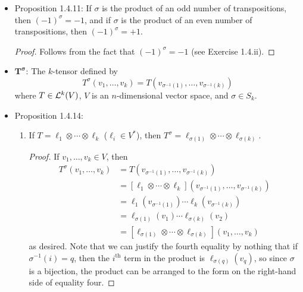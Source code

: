\documentclass[../notes.tex]{subfiles}
\begin{document}
\begin{itemize}
\begin{proof}
\begin{align*}
            &= \prod_{i<j}\frac{x_{\sigma_1\sigma_2(i)}-x_{\sigma_1\sigma_2(j)}}{x_{\sigma_2(i)}-x_{\sigma_2(j)}}\cdot\frac{x_{\sigma_2(i)}-x_{\sigma_2(j)}}{x_i-x_j}\\
            &= \prod_{i<j}\frac{x_{\sigma_1(p)}-x_{\sigma_1(q)}}{x_p-x_q}\cdot\prod_{i<j}\frac{x_{\sigma_2(i)}-x_{\sigma_2(j)}}{x_i-x_j}\\
            &= (-1)^{\sigma_1}(-1)^{\sigma_2}
        \end{align*}
        as desired.
    \end{proof}
    \item Proposition 1.4.11: If $\sigma$ is the product of an odd number of transpositions, then $(-1)^\sigma=-1$, and if $\sigma$ is the product of an even number of transpositions, then $(-1)^\sigma=+1$.
    \begin{proof}
        Follows from the fact that $(-1)^\sigma=-1$ (see Exercise 1.4.ii).
    \end{proof}
    \item $\bm{T^\sigma}$: The $k$-tensor defined by
    \begin{equation*}
        T^\sigma(v_1,\dots,v_k) = T(v_{\sigma^{-1}(1)},\dots,v_{\sigma^{-1}(k)})
    \end{equation*}
    where $T\in\lin[k]{V}$, $V$ is an $n$-dimensional vector space, and $\sigma\in S_k$.
    \item Proposition 1.4.14:
    \begin{enumerate}
        \item If $T=\ell_1\otimes\cdots\otimes\ell_k$ ($\ell_i\in V^*$), then $T^\sigma=\ell_{\sigma(1)}\otimes\cdots\otimes\ell_{\sigma(k)}$.
        \begin{proof}
            If $v_1,\dots,v_k\in V$, then
            \begin{align*}
                T^\sigma(v_1,\dots,v_k) &= T(v_{\sigma^{-1}(1)},\dots,v_{\sigma^{-1}(k)})\\
                &= [\ell_1\otimes\cdots\otimes\ell_k](v_{\sigma^{-1}(1)},\dots,v_{\sigma^{-1}(k)})\\
                &= \ell_1(v_{\sigma^{-1}(1)})\cdots\ell_k(v_{\sigma^{-1}(k)})\\
                &= \ell_{\sigma(1)}(v_1)\cdots\ell_{\sigma(k)}(v_2)\\
                &= [\ell_{\sigma(1)}\otimes\cdots\otimes\ell_{\sigma(k)}](v_1,\dots,v_k)
            \end{align*}
            as desired. Note that we can justify the fourth equality by nothing that if $\sigma^{-1}(i)=q$, then the $i^\text{th}$ term in the product is $\ell_{\sigma(q)}(v_q)$, so since $\sigma$ is a bijection, the product can be arranged to the form on the right-hand side of equality four.

\end{proof}
\end{enumerate}
\end{itemize}
\end{document}
